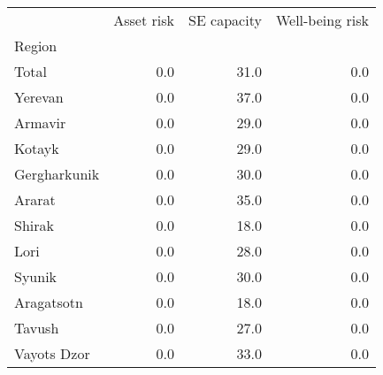 \begin{tabular}{lrrr}
\toprule
{} &  Asset risk &  SE capacity &  Well-being risk \\
Region       &             &              &                  \\
\midrule
Total        &         0.0 &         31.0 &              0.0 \\
Yerevan      &         0.0 &         37.0 &              0.0 \\
Armavir      &         0.0 &         29.0 &              0.0 \\
Kotayk       &         0.0 &         29.0 &              0.0 \\
Gergharkunik &         0.0 &         30.0 &              0.0 \\
Ararat       &         0.0 &         35.0 &              0.0 \\
Shirak       &         0.0 &         18.0 &              0.0 \\
Lori         &         0.0 &         28.0 &              0.0 \\
Syunik       &         0.0 &         30.0 &              0.0 \\
Aragatsotn   &         0.0 &         18.0 &              0.0 \\
Tavush       &         0.0 &         27.0 &              0.0 \\
Vayots Dzor  &         0.0 &         33.0 &              0.0 \\
\bottomrule
\end{tabular}
